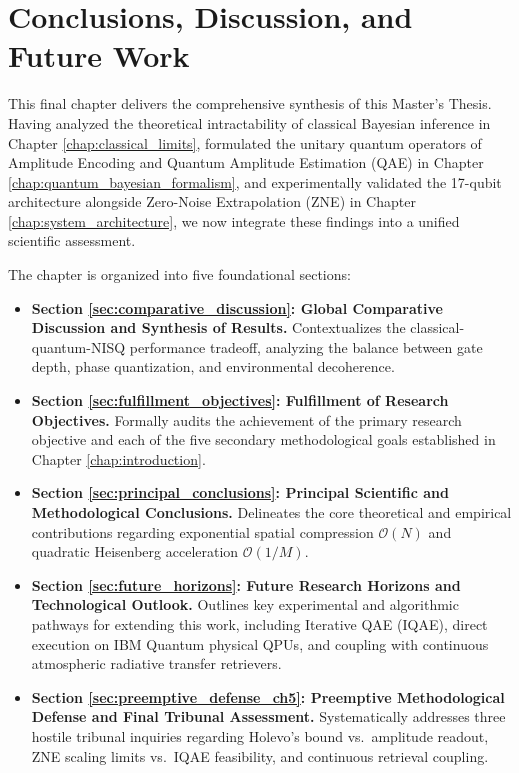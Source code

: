 \chapter{Conclusions, Discussion, and Future Work}\label{chap:conclusions}

This final chapter delivers the comprehensive synthesis of this Master's Thesis. Having analyzed the theoretical intractability of classical Bayesian inference in Chapter \ref{chap:classical_limits}, formulated the unitary quantum operators of Amplitude Encoding and Quantum Amplitude Estimation (QAE) in Chapter \ref{chap:quantum_bayesian_formalism}, and experimentally validated the 17-qubit architecture alongside Zero-Noise Extrapolation (ZNE) in Chapter \ref{chap:system_architecture}, we now integrate these findings into a unified scientific assessment.

The chapter is organized into five foundational sections:
\begin{itemize}
    \item \textbf{Section \ref{sec:comparative_discussion}: Global Comparative Discussion and Synthesis of Results.} Contextualizes the classical-quantum-NISQ performance tradeoff, analyzing the balance between gate depth, phase quantization, and environmental decoherence.
    \item \textbf{Section \ref{sec:fulfillment_objectives}: Fulfillment of Research Objectives.} Formally audits the achievement of the primary research objective and each of the five secondary methodological goals established in Chapter \ref{chap:introduction}.
    \item \textbf{Section \ref{sec:principal_conclusions}: Principal Scientific and Methodological Conclusions.} Delineates the core theoretical and empirical contributions regarding exponential spatial compression $\mathcal{O}(N)$ and quadratic Heisenberg acceleration $\mathcal{O}(1/M)$.
    \item \textbf{Section \ref{sec:future_horizons}: Future Research Horizons and Technological Outlook.} Outlines key experimental and algorithmic pathways for extending this work, including Iterative QAE (IQAE), direct execution on IBM Quantum physical QPUs, and coupling with continuous atmospheric radiative transfer retrievers.
    \item \textbf{Section \ref{sec:preemptive_defense_ch5}: Preemptive Methodological Defense and Final Tribunal Assessment.} Systematically addresses three hostile tribunal inquiries regarding Holevo's bound vs.~amplitude readout, ZNE scaling limits vs.~IQAE feasibility, and continuous retrieval coupling.
\end{itemize}

